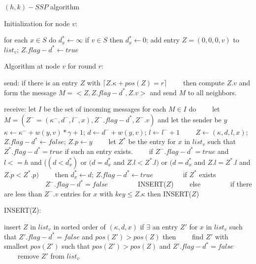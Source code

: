 \documentclass[11pt]{article}  %
\begin{document}
\begin{algorithm}[!h]
    \caption{$(h,k)-SSP$ algorithm}%
    \hspace*{0.02in} Initialization for node $v$:
    \begin{algorithmic}[1]
        \STATE for each $x \in S$ do $d^{*}_{x} \gets \infty$
        \STATE if $v \in S$ then $d^{*}_{x} \gets 0$; add entry $Z=(0,0,0,v)$ to $list_v$; $Z.flag-d^* \gets true$
    \end{algorithmic}
    
    \hspace*{0.02in} Algorithm at node $v$ for round $r$:
    \begin{algorithmic}[1]
        \STATE send: if there is an entry $Z$ with $\lceil Z.\kappa + pos(Z) = r \rceil $
        \STATE ~~~~then compute $Z.v$ and form the message $M = <Z, Z.flag-d^*, Z.v>$ and send $M$ to all neighbors.
        
        \STATE receive: let $I$ be the set of incoming messages
        \STATE for each $M \in I$ do 
        \STATE ~~~~let $M = (Z^- = (\kappa ^-, d^-, l^-,x), Z^-.flag-d^*, Z^-.v) $ and let the sender be $y$
        \STATE ~~~~$\kappa \gets \kappa ^- + w(y,v)*\gamma + 1$; $d \gets d^- +w(y,v)$; $l \gets l^- +1$
        \STATE ~~~~$Z \gets (\kappa, d, l, x)$; $Z.flag-d^* \gets false$; $Z.p \gets y$
        \STATE ~~~~let $Z^*$ be the entry for $x$ in $list_v$ such that $Z^*.flag-d^* = true$ if such an entry exists.
        \STATE ~~~~if $Z^-.flag-d^*=true$ and $l<=h$ and ($(d<d^{*}_{x})$ or $(d=d^{*}_{x}$ and $Z.l< Z^*.l)$ or $(d=d^{*}_{x}$ and $Z.l = Z^*.l$ and $Z.p < Z^*.p)$ 
        \STATE ~~~~then $d^{*}_{x} \gets d$; $Z.flag-d^* \gets true$
        \STATE ~~~~~~~~if $Z^*$ exists
        \STATE ~~~~~~~~~~~~$Z^-.flag-d^*=false$
        \STATE ~~~~~~~~INSERT($Z$)
        \STATE ~~~~else
        \STATE ~~~~~~~~if there are less than $Z^-.v$ entries for $x$ with $key \leq Z.\kappa$ then INSERT($Z$)
    \end{algorithmic}
    
    \hspace*{0.02in} INSERT(Z):
    \begin{algorithmic}[1]
        \STATE insert $Z$ in $list_v$ in sorted order of $(\kappa,d,x)$
        \STATE if $\exists$ an entry $Z'$ for $x$ in $list_v$ such that $Z'.flag-d^* = false$ and $pos(Z')>pos(Z)$ then 
        \STATE ~~~~find $Z'$ with smallest $pos(Z')$ such that $pos(Z')>pos(Z)$ and $Z'.flag-d^* = false$ 
        \STATE ~~~~remove $Z'$ from $list_v$
    \end{algorithmic}
    
\end{algorithm}
\end{document}

